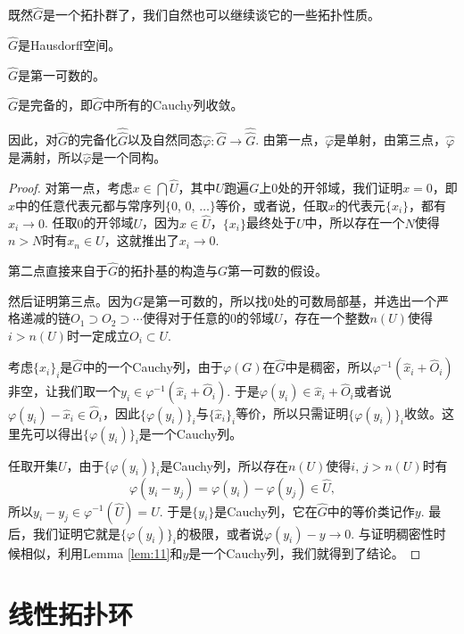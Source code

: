 \begin{para}
	既然$\hat{G}$是一个拓扑群了，我们自然也可以继续谈它的一些拓扑性质。
	\begin{compactenum}
	\item $\hat{G}$是Hausdorff空间。
	\item $\hat{G}$是第一可数的。
	\item $\hat{G}$是完备的，即$\hat{G}$中所有的Cauchy列收敛。
	\item 因此，对$\hat{G}$的完备化$\hat{\hat G}$以及自然同态$\hat\varphi:\hat{G}\to\hat{\hat G}$. 由第一点，$\hat\varphi$是单射，由第三点，$\hat\varphi$是满射，所以$\hat\varphi$是一个同构。
	\end{compactenum}

	\begin{proof}
		对第一点，考虑$x\in \bigcap\hat{U}$，其中$U$跑遍$G$上$0$处的开邻域，我们证明$x=0$，即$x$中的任意代表元都与常序列$\{0$, $0$, $\dots\}$等价，或者说，任取$x$的代表元$\{x_i\}$，都有$x_i\to 0$. 任取$0$的开邻域$U$，因为$x\in \hat{U}$，$\{x_i\}$最终处于$U$中，所以存在一个$N$使得$n>N$时有$x_n\in U$，这就推出了$x_i\to 0$.

		第二点直接来自于$\hat{G}$的拓扑基的构造与$G$第一可数的假设。

		然后证明第三点。因为$G$是第一可数的，所以找$0$处的可数局部基，并选出一个严格递减的链$O_1\supset O_2\supset \cdots$使得对于任意的$0$的邻域$U$，存在一个整数$n(U)$使得$i>n(U)$时一定成立$O_i\subset U$. 

		考虑$\{\hat{x}_i\}_i$是$\hat{G}$中的一个Cauchy列，由于$\varphi(G)$在$\hat{G}$中是稠密，所以$\varphi^{-1}(\hat{x}_i+\hat{O}_i)$非空，让我们取一个$y_i\in\varphi^{-1}(\hat{x}_i+\hat{O}_i)$. 于是$\varphi(y_i)\in \hat{x}_i+\hat{O}_i$或者说$\varphi(y_i)-\hat{x}_i\in \hat{O}_i$，因此$\{\varphi(y_i)\}_i$与$\{\hat{x}_i\}_i$等价，所以只需证明$\{\varphi(y_i)\}_i$收敛。这里先可以得出$\{\varphi(y_i)\}_i$是一个Cauchy列。

		任取开集$U$，由于$\{\varphi(y_i)\}_i$是Cauchy列，所以存在$n(U)$使得$i$, $j>n(U)$时有
		\[
		\varphi(y_i-y_j)=\varphi(y_i)-\varphi(y_j)\in \hat{U},
		\]
		所以$y_i-y_j\in \varphi^{-1}(\hat{U})=U$. 于是$\{y_i\}$是Cauchy列，它在$\hat G$中的等价类记作$y$. 最后，我们证明它就是$\{\varphi(y_i)\}_i$的极限，或者说$\varphi(y_i)-y\to 0$. 与证明稠密性时候相似，利用Lemma \ref{lem:11}和$y$是一个Cauchy列，我们就得到了结论。
	\end{proof}
\end{para}

\section{线性拓扑环}


